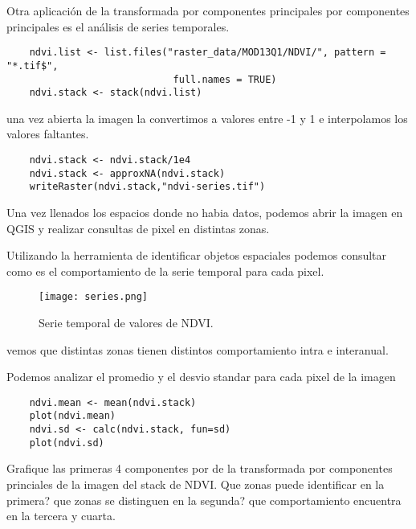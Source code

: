 \begin{exa}
    Otra aplicaci\'on de la transformada por componentes principales por
    componentes principales es el an\'alisis de series temporales.
    \begin{lstlisting}
    ndvi.list <- list.files("raster_data/MOD13Q1/NDVI/", pattern = "*.tif$",
                             full.names = TRUE)
    ndvi.stack <- stack(ndvi.list)
    \end{lstlisting}
    una vez abierta la imagen la convertimos a valores entre -1 y 1 e
    interpolamos los valores faltantes.
    \begin{lstlisting}
    ndvi.stack <- ndvi.stack/1e4
    ndvi.stack <- approxNA(ndvi.stack)
    writeRaster(ndvi.stack,"ndvi-series.tif")
    \end{lstlisting}
    Una vez llenados los espacios donde no habia datos, podemos abrir la imagen
    en QGIS y realizar consultas de pixel en distintas zonas.

    Utilizando la herramienta de identificar objetos espaciales podemos
    consultar como es el comportamiento de la serie temporal para cada pixel.
    \begin{figure}[h!]
    \begin{center}
        \texttt{[image: series.png]}
    \end{center}
    \caption{Serie temporal de valores de NDVI.}
    \label{fig:series}
    \end{figure}
    vemos que distintas zonas tienen distintos comportamiento intra e
    interanual.

    Podemos analizar el promedio y el desvio standar para cada pixel de la
    imagen
    \begin{lstlisting}
    ndvi.mean <- mean(ndvi.stack)
    plot(ndvi.mean)
    ndvi.sd <- calc(ndvi.stack, fun=sd)
    plot(ndvi.sd)
    \end{lstlisting}
\end{exa}

\begin{act}
    Grafique las primeras 4 componentes por de la transformada por componentes
    princiales de la imagen del stack de NDVI\@. Que zonas puede identificar en la
    primera? que zonas se distinguen en la segunda? que comportamiento encuentra
    en la tercera y cuarta.
\end{act}
